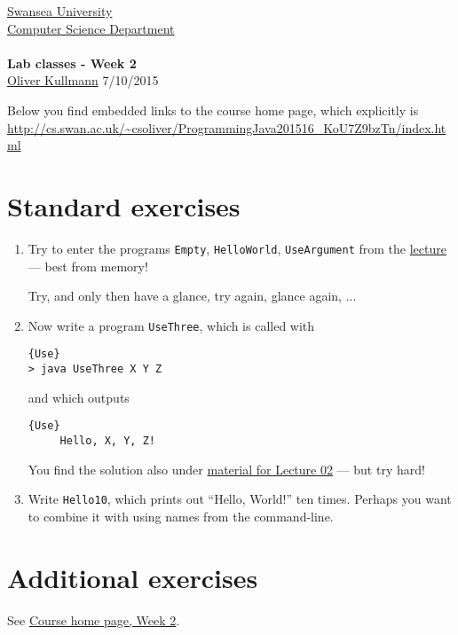 \documentclass[11pt]{article}
\newcommand{\Java}{\lstset{language=Java,keywordstyle=\bfseries,breaklines,breakindent=30pt}}
\begin{document}
\begin{center}
  \href{http://www.swan.ac.uk/}{Swansea University}\\
  \href{http://www.swan.ac.uk/compsci/}{Computer Science Department}\\[1ex]
  \href{\chp}{\module}\\[1ex]
  \textbf{Lab classes - Week 2}\\
  \href{http://cs.swan.ac.uk/~csoliver}{Oliver Kullmann} 7/10/2015
\end{center}

Below you find embedded links to the course home page, which explicitly is \url{http://cs.swan.ac.uk/~csoliver/ProgrammingJava201516_KoU7Z9bzTn/index.html}

\section{Standard exercises}
\label{sec:stdex}

\Java

\begin{enumerate}
\item Try to enter the programs \texttt{Empty}, \texttt{HelloWorld}, \texttt{UseArgument} from the \href{http://cs.swan.ac.uk/~csoliver/ProgrammingJava201516_KoU7Z9bzTn/index.html#LecturesWeek02}{lecture} --- best from memory!
  \begin{center}
    Try, and only then have a glance, try again, glance again, ...
  \end{center}
\item Now write a program \texttt{UseThree}, which is called with
  \begin{lstlisting}{Use}
> java UseThree X Y Z
  \end{lstlisting}
   and which outputs
   \begin{lstlisting}{Use}
     Hello, X, Y, Z!
   \end{lstlisting}
   You find the solution also under \href{http://cs.swan.ac.uk/~csoliver/ProgrammingJava201516_KoU7Z9bzTn/index.html#LecturesWeek02}{material for Lecture 02} --- but try hard!
 \item Write \texttt{Hello10}, which prints out ``Hello, World!'' ten times. Perhaps you want to combine it with using names from the command-line.
\end{enumerate}


\section{Additional exercises}
\label{sec:addex}

See \href{\chp#ExercisesWeek02}{Course home page, Week 2}.
\end{document}
